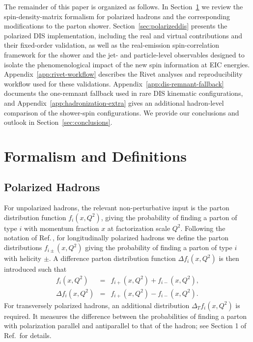 \documentclass[a4paper,11pt]{article}
\begin{document}
The remainder of this paper is organized as follows. In Section~\ref{sec:formalism} we review the spin-density-matrix formalism for polarized hadrons and the corresponding modifications to the parton shower. Section~\ref{sec:polarizeddis} presents the polarized DIS implementation, including the real and virtual contributions and their fixed-order validation, as well as the real-emission spin-correlation framework for the shower and the jet- and particle-level observables designed to isolate the phenomenological impact of the new spin information at EIC energies. Appendix~\ref{app:rivet-workflow} describes the Rivet analyses and reproducibility workflow used for these validations. Appendix~\ref{app:dis-remnant-fallback} documents the one-remnant fallback used in rare DIS kinematic configurations, and Appendix~\ref{app:hadronization-extra} gives an additional hadron-level comparison of the shower-spin configurations. We provide our conclusions and outlook in Section~\ref{sec:conclusions}.

\section{Formalism and Definitions}\label{sec:formalism}
\subsection{Polarized Hadrons}


For unpolarized hadrons, the relevant non-perturbative input is the parton distribution function $f_i(x,Q^2)$, giving the probability of finding a parton of type $i$ with momentum fraction $x$ at factorization scale $Q^2$.
Following the notation of Ref.\,\cite{Barone:2001sp}, for longitudinally polarized hadrons
we define the parton distributions $f_{i\pm}(x,Q^2)$ giving the probability of finding a parton of type $i$ with helicity $\pm$.
A difference parton distribution function $\Delta f_i(x,Q^2)$ is then introduced such that
\begin{subequations}
\begin{eqnarray}
  f_i(x,Q^2)        &=& f_{i+}(x,Q^2) + f_{i-}(x,Q^2),\\
  \Delta f_i(x,Q^2) &=& f_{i+}(x,Q^2) - f_{i-}(x,Q^2).
\end{eqnarray}
\end{subequations}
For transversely polarized hadrons, an additional distribution $\Delta_T f_i(x,Q^2)$ is required. It measures the difference between the probabilities of finding a parton with polarization parallel and antiparallel to that of the hadron; see Section 1 of Ref.\,\cite{Barone:2001sp} for details.
\end{document}
